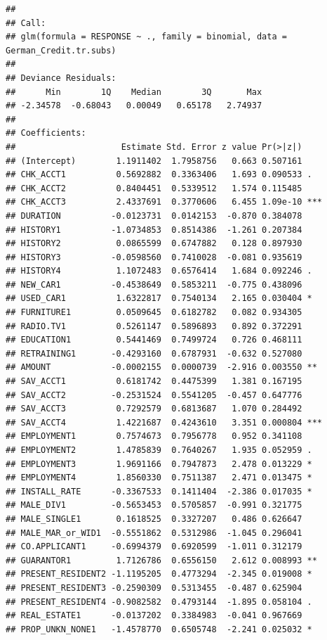 \documentclass[
]{article}
\begin{document}
\begin{verbatim}
## 
## Call:
## glm(formula = RESPONSE ~ ., family = binomial, data = German_Credit.tr.subs)
## 
## Deviance Residuals: 
##      Min        1Q    Median        3Q       Max  
## -2.34578  -0.68043   0.00049   0.65178   2.74937  
## 
## Coefficients:
##                     Estimate Std. Error z value Pr(>|z|)    
## (Intercept)        1.1911402  1.7958756   0.663 0.507161    
## CHK_ACCT1          0.5692882  0.3363406   1.693 0.090533 .  
## CHK_ACCT2          0.8404451  0.5339512   1.574 0.115485    
## CHK_ACCT3          2.4337691  0.3770606   6.455 1.09e-10 ***
## DURATION          -0.0123731  0.0142153  -0.870 0.384078    
## HISTORY1          -1.0734853  0.8514386  -1.261 0.207384    
## HISTORY2           0.0865599  0.6747882   0.128 0.897930    
## HISTORY3          -0.0598560  0.7410028  -0.081 0.935619    
## HISTORY4           1.1072483  0.6576414   1.684 0.092246 .  
## NEW_CAR1          -0.4538649  0.5853211  -0.775 0.438096    
## USED_CAR1          1.6322817  0.7540134   2.165 0.030404 *  
## FURNITURE1         0.0509645  0.6182782   0.082 0.934305    
## RADIO.TV1          0.5261147  0.5896893   0.892 0.372291    
## EDUCATION1         0.5441469  0.7499724   0.726 0.468111    
## RETRAINING1       -0.4293160  0.6787931  -0.632 0.527080    
## AMOUNT            -0.0002155  0.0000739  -2.916 0.003550 ** 
## SAV_ACCT1          0.6181742  0.4475399   1.381 0.167195    
## SAV_ACCT2         -0.2531524  0.5541205  -0.457 0.647776    
## SAV_ACCT3          0.7292579  0.6813687   1.070 0.284492    
## SAV_ACCT4          1.4221687  0.4243610   3.351 0.000804 ***
## EMPLOYMENT1        0.7574673  0.7956778   0.952 0.341108    
## EMPLOYMENT2        1.4785839  0.7640267   1.935 0.052959 .  
## EMPLOYMENT3        1.9691166  0.7947873   2.478 0.013229 *  
## EMPLOYMENT4        1.8560330  0.7511387   2.471 0.013475 *  
## INSTALL_RATE      -0.3367533  0.1411404  -2.386 0.017035 *  
## MALE_DIV1         -0.5653453  0.5705857  -0.991 0.321775    
## MALE_SINGLE1       0.1618525  0.3327207   0.486 0.626647    
## MALE_MAR_or_WID1  -0.5551862  0.5312986  -1.045 0.296041    
## CO.APPLICANT1     -0.6994379  0.6920599  -1.011 0.312179    
## GUARANTOR1         1.7126786  0.6556150   2.612 0.008993 ** 
## PRESENT_RESIDENT2 -1.1195205  0.4773294  -2.345 0.019008 *  
## PRESENT_RESIDENT3 -0.2590309  0.5313455  -0.487 0.625904    
## PRESENT_RESIDENT4 -0.9082582  0.4793144  -1.895 0.058104 .  
## REAL_ESTATE1      -0.0137202  0.3384983  -0.041 0.967669    
## PROP_UNKN_NONE1   -1.4578770  0.6505748  -2.241 0.025032 *  

\end{verbatim}
\end{document}
